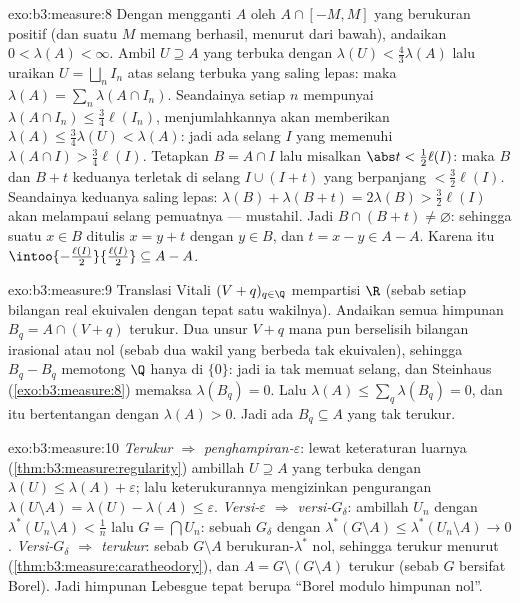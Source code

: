 \begin{solution}{exo:b3:measure:8}
Dengan mengganti $A$ oleh $A \cap [-M, M]$ yang berukuran positif (dan suatu $M$
memang berhasil, menurut  dari bawah), andaikan $0 < \lambda(A) <
\infty$. Ambil $U \supseteq A$ yang terbuka dengan $\lambda(U) <
\frac43\lambda(A)$ lalu uraikan $U = \bigsqcup_nI_n$ atas
selang terbuka yang saling lepas: maka $\lambda(A) = \sum_n\lambda(A\cap
I_n)$. Seandainya setiap $n$ mempunyai $\lambda(A\cap I_n) \leq
\frac34\ell(I_n)$, menjumlahkannya akan memberikan $\lambda(A) \leq
\frac34\lambda(U) < \lambda(A)$: jadi ada selang $I$ yang memenuhi
$\lambda(A\cap I) > \frac34\ell(I)$. Tetapkan $B = A \cap I$ lalu misalkan
$\abs t < \frac12\ell(I)$: maka $B$ dan $B + t$ keduanya terletak di
selang $I \cup (I + t)$ yang berpanjang $< \frac32\ell(I)$. Seandainya
keduanya saling lepas: $\lambda(B) + \lambda(B + t) = 2\lambda(B)
> \frac32\ell(I)$ akan melampaui  selang pemuatnya
--- mustahil. Jadi $B \cap (B + t) \neq \varnothing$:
sehingga suatu $x \in B$ ditulis $x = y + t$ dengan $y \in B$, dan $t = x -
y \in A - A$.
Karena itu $\intoo{-\frac{\ell(I)}2}{\frac{\ell(I)}2} \subseteq A -
A$.
\end{solution}

\begin{solution}{exo:b3:measure:9}
Translasi Vitali $(V + q)_{q\in\Q}$ mempartisi $\R$ (sebab setiap
bilangan real ekuivalen dengan tepat satu wakilnya). Andaikan semua
himpunan $B_q = A \cap (V + q)$ terukur. Dua unsur
$V + q$ mana pun berselisih bilangan irasional atau nol (sebab dua
wakil yang berbeda tak ekuivalen), sehingga $B_q - B_q$
memotong $\Q$ hanya di $\{0\}$: jadi ia tak memuat selang, dan
Steinhaus (\cref{exo:b3:measure:8}) memaksa $\lambda(B_q) = 0$.
Lalu $\lambda(A) \leq \sum_{q}\lambda(B_q) = 0$, dan itu bertentangan dengan
$\lambda(A) > 0$. Jadi ada $B_q \subseteq A$ yang tak terukur.
\end{solution}

\begin{solution}{exo:b3:measure:10}
\emph{Terukur $\Rightarrow$ penghampiran-$\varepsilon$}: lewat
keteraturan luarnya (\cref{thm:b3:measure:regularity}) ambillah
$U \supseteq A$ yang terbuka dengan $\lambda(U) \leq \lambda(A) +
\varepsilon$; lalu keterukurannya mengizinkan pengurangan
$\lambda(U\setminus A) = \lambda(U) - \lambda(A) \leq
\varepsilon$. \emph{Versi-$\varepsilon$ $\Rightarrow$
versi-$G_\delta$}: ambillah $U_n$ dengan $\lambda^*(U_n\setminus
A) < \frac1n$ lalu $G = \bigcap U_n$: sebuah $G_\delta$ dengan
$\lambda^*(G\setminus A) \leq \lambda^*(U_n\setminus A) \to 0$.
\emph{Versi-$G_\delta$ $\Rightarrow$ terukur}: sebab $G\setminus
A$ berukuran-$\lambda^*$ nol, sehingga terukur menurut 
(\cref{thm:b3:measure:caratheodory}), dan $A = G \setminus
(G\setminus A)$ terukur (sebab $G$ bersifat Borel). Jadi himpunan Lebesgue
tepat berupa ``Borel modulo himpunan nol''.
\end{solution}

